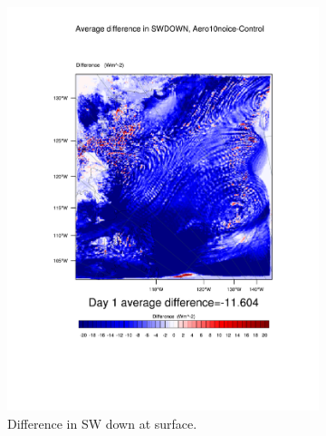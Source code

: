 \begin{figure}
\centering
	\begin{subfigure}{0.48\textwidth}
		\includegraphics[width=\textwidth]{results/aero10ni/diff_Aero10NoIce_SWDOWN_Day1.pdf}
		\caption{Difference in SW down at surface.}
		\label{subfig:swdown_r4Day1}
	\end{subfigure}
	\quad
	\begin{subfigure}{0.48\textwidth}
		\centering

\end{subfigure}
\end{figure}
